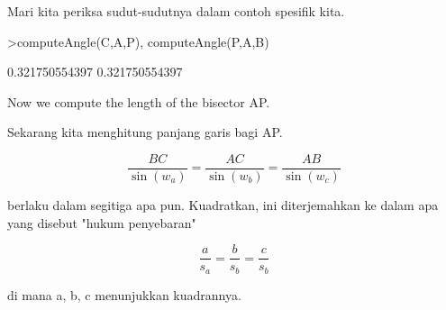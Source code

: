 \documentclass[12pt,arial,letterpaper]{book}
\begin{document}
\begin{eulernootebook}
\begin{eulercomment}
\begin{eulercomment}
\begin{eulernootebook}
\begin{eulercomment}
\begin{eulercomment}
\begin{eulercomment}
\begin{eulercomment}
\begin{eulercomment}
\begin{eulercomment}
\begin{eulernotebook}
\begin{eulercomment}
\begin{eulercomment}
\begin{eulercomment}
\begin{eulercomment}
\begin{eulercomment}
Mari kita periksa sudut-sudutnya dalam contoh spesifik kita.
\end{eulercomment}
\begin{eulerprompt}
>computeAngle(C,A,P), computeAngle(P,A,B)
\end{eulerprompt}
\begin{euleroutput}
  0.321750554397
  0.321750554397
\end{euleroutput}
\begin{eulercomment}
Now we compute the length of the bisector AP.

Sekarang kita menghitung panjang garis bagi AP.

\end{eulercomment}
\begin{eulerformula}
\[
\frac{BC}{\sin(w_a)} = \frac{AC}{\sin(w_b)} = \frac{AB}{\sin(w_c)}
\]
\end{eulerformula}
\begin{eulercomment}
berlaku dalam segitiga apa pun. Kuadratkan, ini diterjemahkan ke dalam
apa yang disebut "hukum penyebaran"

\end{eulercomment}
\begin{eulerformula}
\[
\frac{a}{s_a} = \frac{b}{s_b} = \frac{c}{s_b}
\]
\end{eulerformula}
\begin{eulercomment}
di mana a, b, c menunjukkan kuadrannya.


\end{eulercomment}
\end{eulercomment}
\end{eulercomment}
\end{eulercomment}
\end{eulercomment}
\end{eulernotebook}
\end{eulercomment}
\end{eulercomment}
\end{eulercomment}
\end{eulercomment}
\end{eulercomment}
\end{eulercomment}
\end{eulernootebook}
\end{eulercomment}
\end{eulercomment}
\end{eulernootebook}
\end{document}
